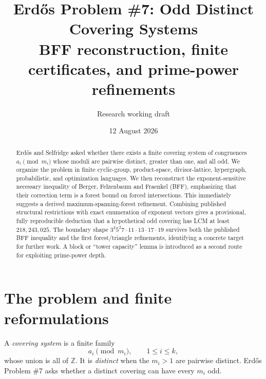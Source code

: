 \documentclass[11pt]{article}
\title{Erd\H{o}s Problem \#7: Odd Distinct Covering Systems\\
\large BFF reconstruction, finite certificates, and prime-power refinements}
\author{Research working draft}
\date{12 August 2026}
\theoremstyle{definition}
\newcommand{\Z}{\mathbb Z}
\begin{document}
\maketitle

\begin{center}
\end{center}

\begin{abstract}
Erd\H{o}s and Selfridge asked whether there exists a finite covering system of congruences
$a_i\pmod{m_i}$ whose moduli are pairwise distinct, greater than one, and all odd.  We organize
the problem in finite cyclic-group, product-space, divisor-lattice, hypergraph, probabilistic,
and optimization languages.  We then reconstruct the exponent-sensitive necessary inequality
of Berger, Felzenbaum and Fraenkel (BFF), emphasizing that their correction term is a forest
bound on forced intersections.  This immediately suggests a derived maximum-spanning-forest
refinement.  Combining published structural restrictions with exact enumeration of exponent
vectors gives a provisional, fully reproducible deduction that a hypothetical odd covering has
LCM at least $218{,}243{,}025$.  The boundary shape
$3^3 5^2 7\cdot11\cdot13\cdot17\cdot19$ survives both the published BFF inequality and the
first forest/triangle refinements, identifying a concrete target for further work.  A block or
``tower capacity'' lemma is introduced as a second route for exploiting prime-power depth.
\end{abstract}

\tableofcontents

\section{The problem and finite reformulations}

A \emph{covering system} is a finite family
\[
 a_i\pmod{m_i},\qquad 1\le i\le k,
\]
whose union is all of $\Z$.  It is \emph{distinct} when the $m_i>1$ are pairwise distinct.
Erd\H{o}s Problem \#7 asks whether a distinct covering can have every $m_i$ odd.
\end{document}
